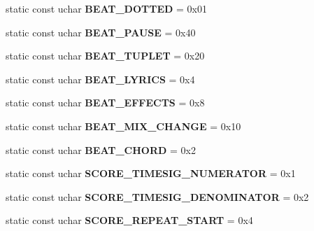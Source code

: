 \begin{DoxyCompactItemize}
static const uchar {\bfseries B\+E\+A\+T\+\_\+\+D\+O\+T\+T\+ED} = 0x01
\item 
\mbox{\label{class_ms_1_1_guitar_pro_ad135d6a7579f890c2e6a33483d7cd7a7}} 
static const uchar {\bfseries B\+E\+A\+T\+\_\+\+P\+A\+U\+SE} = 0x40
\item 
\mbox{\label{class_ms_1_1_guitar_pro_a7e75d9a0a813a345e2315f3fa6584717}} 
static const uchar {\bfseries B\+E\+A\+T\+\_\+\+T\+U\+P\+L\+ET} = 0x20
\item 
\mbox{\label{class_ms_1_1_guitar_pro_ab65ac42a49b26bc9da5c373c2953359d}} 
static const uchar {\bfseries B\+E\+A\+T\+\_\+\+L\+Y\+R\+I\+CS} = 0x4
\item 
\mbox{\label{class_ms_1_1_guitar_pro_ad49fa1138721530905f1371fdfca7a75}} 
static const uchar {\bfseries B\+E\+A\+T\+\_\+\+E\+F\+F\+E\+C\+TS} = 0x8
\item 
\mbox{\label{class_ms_1_1_guitar_pro_a0300ec335739e2a0069a8912855c060f}} 
static const uchar {\bfseries B\+E\+A\+T\+\_\+\+M\+I\+X\+\_\+\+C\+H\+A\+N\+GE} = 0x10
\item 
\mbox{\label{class_ms_1_1_guitar_pro_a87a7c93edc0566fd3ab1fd6745b97eb1}} 
static const uchar {\bfseries B\+E\+A\+T\+\_\+\+C\+H\+O\+RD} = 0x2
\item 
\mbox{\label{class_ms_1_1_guitar_pro_a59a851ab59702ccfefeaf85b88b2b8fb}} 
static const uchar {\bfseries S\+C\+O\+R\+E\+\_\+\+T\+I\+M\+E\+S\+I\+G\+\_\+\+N\+U\+M\+E\+R\+A\+T\+OR} = 0x1
\item 
\mbox{\label{class_ms_1_1_guitar_pro_a5584981b0be218d0de60bf00617d6e6a}} 
static const uchar {\bfseries S\+C\+O\+R\+E\+\_\+\+T\+I\+M\+E\+S\+I\+G\+\_\+\+D\+E\+N\+O\+M\+I\+N\+A\+T\+OR} = 0x2
\item 
\mbox{\label{class_ms_1_1_guitar_pro_a7c4abc73bb6280700fa709ed98608df8}} 
static const uchar {\bfseries S\+C\+O\+R\+E\+\_\+\+R\+E\+P\+E\+A\+T\+\_\+\+S\+T\+A\+RT} = 0x4
\item 
\mbox{\label{class_ms_1_1_guitar_pro_a6250844d23bd8ebef649613ace9a62ea}} 

\end{DoxyCompactItemize}
